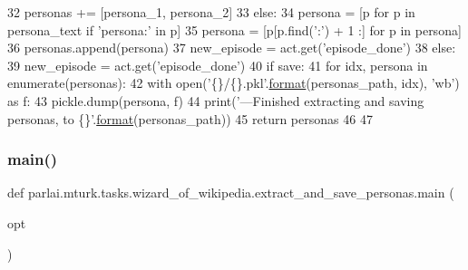 \begin{DoxyCode}
32                 personas += [persona\_1, persona\_2]
33             \textcolor{keywordflow}{else}:
34                 persona = [p \textcolor{keywordflow}{for} p \textcolor{keywordflow}{in} persona\_text \textcolor{keywordflow}{if} \textcolor{stringliteral}{'persona:'} \textcolor{keywordflow}{in} p]
35                 persona = [p[p.find(\textcolor{stringliteral}{':'}) + 1 :] \textcolor{keywordflow}{for} p \textcolor{keywordflow}{in} persona]
36                 personas.append(persona)
37             new\_episode = act.get(\textcolor{stringliteral}{'episode\_done'})
38         \textcolor{keywordflow}{else}:
39             new\_episode = act.get(\textcolor{stringliteral}{'episode\_done'})
40     \textcolor{keywordflow}{if} save:
41         \textcolor{keywordflow}{for} idx, persona \textcolor{keywordflow}{in} enumerate(personas):
42             with open(\textcolor{stringliteral}{'\{\}/\{\}.pkl'}.\hyperlink{namespaceparlai_1_1chat__service_1_1services_1_1messenger_1_1shared__utils_a32e2e2022b824fbaf80c747160b52a76}{format}(personas\_path, idx), \textcolor{stringliteral}{'wb'}) \textcolor{keyword}{as} f:
43                 pickle.dump(persona, f)
44         print(\textcolor{stringliteral}{'---Finished extracting and saving personas, to \{\}'}.\hyperlink{namespaceparlai_1_1chat__service_1_1services_1_1messenger_1_1shared__utils_a32e2e2022b824fbaf80c747160b52a76}{format}(personas\_path))
45     \textcolor{keywordflow}{return} personas
46 
47 
\end{DoxyCode}
\mbox{\label{namespaceparlai_1_1mturk_1_1tasks_1_1wizard__of__wikipedia_1_1extract__and__save__personas_a8760b04b46dbe7ee79bd15ae3b20761c}} 
\subsubsection{\texorpdfstring{main()}{main()}}
{\footnotesize\ttfamily def parlai.\+mturk.\+tasks.\+wizard\+\_\+of\+\_\+wikipedia.\+extract\+\_\+and\+\_\+save\+\_\+personas.\+main (\begin{DoxyParamCaption}\item[{}]{opt }\end{DoxyParamCaption})}



